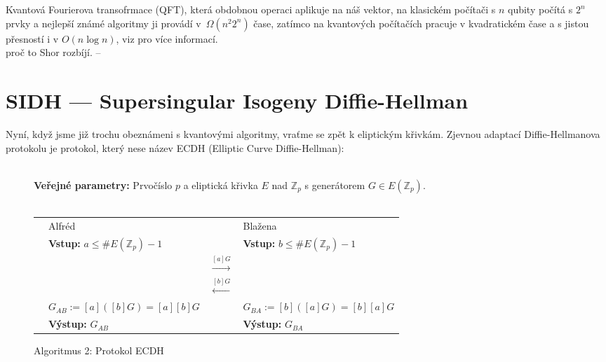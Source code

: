 \documentclass [12pt]{report}
\begin{document}
Kvantová Fourierova transofrmace (QFT), která obdobnou operaci aplikuje na náš vektor, na klasickém počítači s $n$ qubity počítá s $2^n$ prvky a nejlepší známé algoritmy ji provádí v~$\Omega (n^2 2^n)$ čase, zatímco na kvantových počítačích pracuje v kvadratickém čase a s jistou přesností i v $O(n \log n)$, viz \cite[Ch. 4. a 5.]{Chuang} pro více informací.\\
 



proč to Shor rozbíjí.
--

\section{SIDH ---  Supersingular Isogeny Diffie-Hellman}

Nyní, když jsme již trochu obeznámeni s kvantovými algoritmy, vraťme se zpět k eliptickým křivkám. Zjevnou adaptací Diffie-Hellmanova protokolu je protokol, který nese název ECDH (Elliptic Curve Diffie-Hellman):
\begin{figure}[h]
\begin{center} 
\makebox[1cm]{\rule{17.3cm}{0.4pt}}\\
\hspace{-1.35cm} \textbf{Veřejné parametry:} Prvočíslo $p$ a eliptická křivka $E$ nad $\mathbb{Z}_p$ s generátorem $G \in E(\mathbb{Z}_p)$.\\

\vspace{-0.25cm}
\makebox[\linewidth]{\rule{17.3cm}{0.4pt}}\\
\vspace{0.2cm}
\begin{tabular}{l l c l}
\cline{2-2} \cline{4-4} 
& Alfréd & & Blažena \\ 
\cline{2-2} \cline{4-4} 
& \textbf{Vstup:} $a \leqslant \# E(\mathbb{Z}_p)-1$ & & \textbf{Vstup:} $b \leqslant \# E(\mathbb{Z}_p)-1$ \\
 & & $\stackrel{[a]G}{\longrightarrow} $ &  \\
&  & $\stackrel{[b]G}{\longleftarrow} $ &  \\
& $G_{AB} := [a]([b]G) = [a][b]G$ &  & $ G_{BA} := [b]([a]G) = [b][a]G$ \\
& \textbf{Výstup:} $G_{AB}$ & & \textbf{Výstup:} $G_{BA}$
\end{tabular}
\caption*{Algoritmus 2: Protokol ECDH}

\end{center}
\end{figure}
\end{document}
